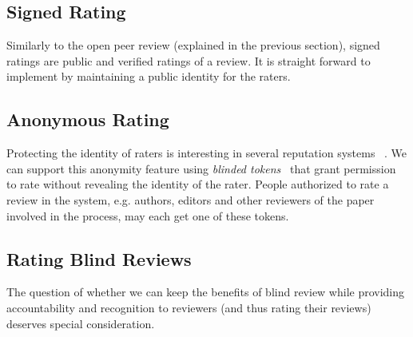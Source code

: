 
\subsection*{Signed Rating}
Similarly to the open peer review (explained in the previous section), signed
ratings are public and verified ratings of a review. It is straight forward to
implement by maintaining a public identity for the raters.

\subsection*{Anonymous Rating}

Protecting the identity of raters is interesting in several reputation systems
~\cite{schaub2016trustless}. We can support this anonymity feature using
\emph{blinded tokens}~\cite{schaub2016trustless} that grant permission to rate
without revealing the identity of the rater. People authorized to rate a review
in the system, e.g. authors, editors and other reviewers of the paper involved
in the process, may each get one of these tokens.

\subsection*{Rating Blind Reviews}

The question of whether we can keep the benefits of blind review while providing
accountability and recognition to reviewers (and thus rating their reviews)
deserves special consideration.

